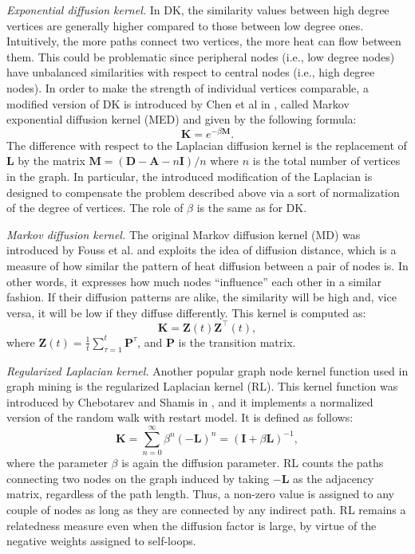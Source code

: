 \documentclass[review]{elsarticle}
\begin{document}
{\it Exponential diffusion kernel.} In DK, the similarity values between high degree vertices are generally higher compared to those between low degree ones. Intuitively, the more paths connect two vertices, the more heat can flow between them. This could be problematic since peripheral nodes (i.e., low degree nodes) have unbalanced similarities with respect to central nodes (i.e., high degree nodes). In order to make the strength of individual vertices comparable, a modified version of DK is introduced by Chen et al in \cite{chen2014disease}, called Markov exponential diffusion kernel (MED) and given by the following formula:
\begin{equation} \label{MEDK-formula}
\textbf{K} = e^{-\beta \textbf{M}}.
\end{equation}
The difference with respect to the Laplacian diffusion kernel is the replacement of $\textbf{L}$ by the matrix $\textbf{M}=(\textbf{D}-\textbf{A}-n\textbf{I})/n$ where $n$ is the total number of vertices in the graph. In particular, the introduced modification of the Laplacian is designed to compensate the problem described above via a sort of normalization of the degree of vertices. The role of $\beta$ is the same as for DK.

{\it Markov diffusion kernel.} The original Markov diffusion kernel (MD) was introduced by Fouss et al. \cite{fouss2006experimental} and exploits the idea of diffusion distance, which is a measure of how similar the pattern of heat diffusion  between a pair of  nodes is. In other words, it expresses how much nodes ``influence'' each other in a similar fashion. If their diffusion patterns are alike, the similarity will be high and, vice versa, it will be low if they diffuse differently. This kernel is computed as:
\begin{equation} 
\label{MDK-formula}
\textbf{K} = \textbf{Z}(t)\textbf{Z}^{\top}(t),
\end{equation}
where $\textbf{Z}(t) = \frac{1}{t}\sum_{\tau=1}^{t}\textbf{P}^{\tau}$, and $\textbf{P}$ is the transition matrix.

{\it Regularized Laplacian kernel.} Another popular graph node kernel function used in graph mining is the regularized Laplacian kernel (RL). This kernel function was introduced by Chebotarev and Shamis in \cite{chebotarev2006matrix}, and it implements a normalized version of the random walk with restart model. It is defined as follows:
\begin{equation} 
\label{RLK-formula}
\textbf{K} = \sum_{n=0}^{\infty}\beta^{n}(-\textbf{L})^n = (\textbf{I} + \beta \textbf{L})^{-1},
\end{equation}
where the parameter $\beta$ is again the diffusion parameter. RL counts the paths connecting two nodes on the graph induced by taking $-\textbf{L}$ as the adjacency matrix, regardless of the path length. Thus, a non-zero value is assigned to any couple of nodes as long as they are connected by any indirect path. RL remains a relatedness measure even when the diffusion factor is large, by virtue of the negative weights assigned to self-loops.
\end{document}
